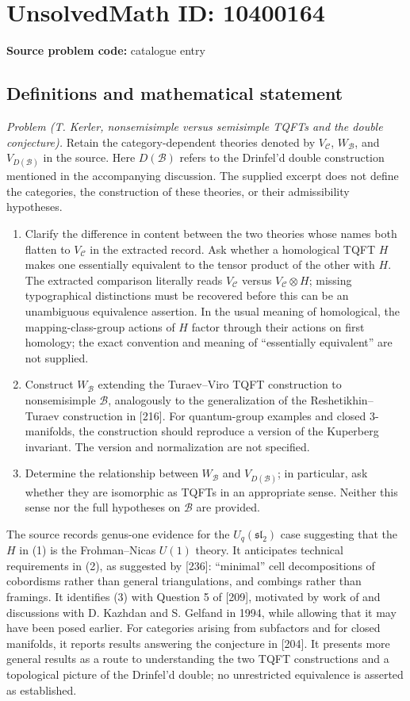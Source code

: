 \documentclass[11pt]{article}
\begin{document}
\section*{UnsolvedMath ID: 10400164}
\textbf{Source problem code:} catalogue entry
\subsection{Definitions and mathematical statement}
\emph{Problem (T. Kerler, nonsemisimple versus semisimple TQFTs and the double conjecture).} Retain the category-dependent theories denoted by \(V_{\mathcal C}\), \(W_{\mathcal B}\), and \(V_{D(\mathcal B)}\) in the source. Here \(D(\mathcal B)\) refers to the Drinfel'd double construction mentioned in the accompanying discussion. The supplied excerpt does not define the categories, the construction of these theories, or their admissibility hypotheses.
\begin{enumerate}
\item Clarify the difference in content between the two theories whose names both flatten to \(V_{\mathcal C}\) in the extracted record. Ask whether a homological TQFT \(H\) makes one essentially equivalent to the tensor product of the other with \(H\). The extracted comparison literally reads \(V_{\mathcal C}\) versus \(V_{\mathcal C}\otimes H\); missing typographical distinctions must be recovered before this can be an unambiguous equivalence assertion. In the usual meaning of homological, the mapping-class-group actions of \(H\) factor through their actions on first homology; the exact convention and meaning of ``essentially equivalent'' are not supplied.
\item Construct \(W_{\mathcal B}\) extending the Turaev--Viro TQFT construction to nonsemisimple \(\mathcal B\), analogously to the generalization of the Reshetikhin--Turaev construction in [216]. For quantum-group examples and closed \(3\)-manifolds, the construction should reproduce a version of the Kuperberg invariant. The version and normalization are not specified.
\item Determine the relationship between \(W_{\mathcal B}\) and \(V_{D(\mathcal B)}\); in particular, ask whether they are isomorphic as TQFTs in an appropriate sense. Neither this sense nor the full hypotheses on \(\mathcal B\) are provided.
\end{enumerate}
The source records genus-one evidence for the \(U_q(\mathfrak{sl}_2)\) case suggesting that the \(H\) in (1) is the Frohman--Nicas \(U(1)\) theory. It anticipates technical requirements in (2), as suggested by [236]: ``minimal'' cell decompositions of cobordisms rather than general triangulations, and combings rather than framings. It identifies (3) with Question 5 of [209], motivated by work of and discussions with D. Kazhdan and S. Gelfand in 1994, while allowing that it may have been posed earlier. For categories arising from subfactors and for closed manifolds, it reports results answering the conjecture in [204]. It presents more general results as a route to understanding the two TQFT constructions and a topological picture of the Drinfel'd double; no unrestricted equivalence is asserted as established.
\end{document}
